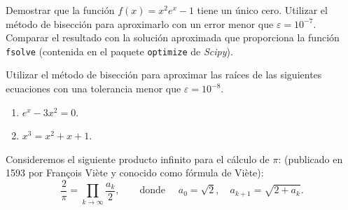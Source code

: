 \documentclass[11pt]{article}
\begin{document}

\begin{problemas}
  \begin{problema}
    Demostrar que la función $f(x)=x^2e^{x}-1$ tiene un único
    cero. Utilizar el método de bisección para aproximarlo con un
    error menor que $\varepsilon=10^{-7}$. Comparar el resultado con
    la solución aproximada que proporciona la función \texttt{fsolve}
    (contenida en el paquete \texttt{optimize} de \textit{Scipy}).
  \end{problema}
  \begin{problema}
    Utilizar el método de bisección para aproximar las raíces de las
    siguientes ecuaciones con una tolerancia menor que
    $\varepsilon=10^{-8}$.
    \begin{enumerate}
    \item $e^x-3x^2=0$.
    \item $x^3=x^2+x+1$.
    \end{enumerate}
  \end{problema}
 \begin{problema}
    Consideremos el siguiente producto infinito para el cálculo de $\pi$:
    (publicado en 1593 por François Viète y conocido como fórmula de Viète):
    \begin{equation*}
      \frac{2}{\pi}  = \prod_{k\to\infty} \frac{a_k}2, \qquad\text{donde }\quad
      a_0 = \sqrt{2}, \quad a_{k+1} = \sqrt{2+a_k}.
    \end{equation*}


\end{problema}
\end{problemas}
\end{document}
